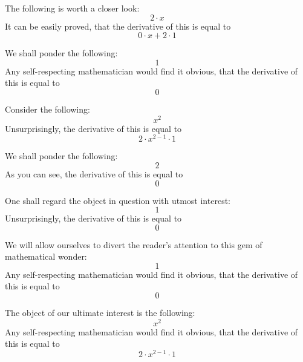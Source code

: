 \documentclass{article}
\begin{document}
The following is worth a closer look:
\begin{equation}
2 \cdot x 
\end{equation}
It can be easily proved, that the derivative of this is equal to
\begin{equation}
0 \cdot x + 2 \cdot 1 
\end{equation}

We shall ponder the following:
\begin{equation}
1 
\end{equation}
Any self-respecting mathematician would find it obvious, that the derivative of this is equal to
\begin{equation}
0 
\end{equation}

Consider the following:
\begin{equation}
x ^{2 } 
\end{equation}
Unsurprisingly, the derivative of this is equal to
\begin{equation}
2 \cdot x ^{2 - 1 } \cdot 1 
\end{equation}

We shall ponder the following:
\begin{equation}
2 
\end{equation}
As you can see, the derivative of this is equal to
\begin{equation}
0 
\end{equation}

One shall regard the object in question with utmost interest:
\begin{equation}
1 
\end{equation}
Unsurprisingly, the derivative of this is equal to
\begin{equation}
0 
\end{equation}

We will allow ourselves to divert the reader's attention to this gem of mathematical wonder:
\begin{equation}
1 
\end{equation}
Any self-respecting mathematician would find it obvious, that the derivative of this is equal to
\begin{equation}
0 
\end{equation}

The object of our ultimate interest is the following:
\begin{equation}
x ^{2 } 
\end{equation}
Any self-respecting mathematician would find it obvious, that the derivative of this is equal to
\begin{equation}
2 \cdot x ^{2 - 1 } \cdot 1 
\end{equation}
\end{document}
